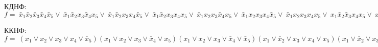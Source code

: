 \documentclass[a4paper, 20pt]{article}
\newcommand{\nx}[1]{\bar{x}_{#1}}
\newcommand{\x}[1]{x_{#1}}
\begin{document}
  КДНФ: $ f = \
  \nx{1}\nx{2}\nx{3}\nx{4}\nx{5} \vee \
  \nx{1}\nx{2}\x {3}\nx{4}\x {5} \vee \
  \nx{1}\nx{2}\x {3}\x {4}\nx{5} \vee \
  \nx{1}\nx{2}\x {3}\x {4}\x {5} \vee \
  \nx{1}\x {2}\x {3}\nx{4}\x {5} \vee \
  \nx{1}\x {2}\x {3}\x {4}\nx{5} \vee \
  \nx{1}\x {2}\x {3}\x {4}\x {5} \vee \
  \x {1}\nx{2}\nx{3}\x {4}\x {5} \vee \
  \x {1}\nx{2}\x {3}\nx{4}\x {5} \vee \
  \x {1}\nx{2}\x {3}\x {4}\nx{5} \vee \
  \x {1}\x {2}\nx{3}\x {4}\nx{5} \vee \
  \x {1}\x {2}\nx{3}\x {4}\x {5} \vee \
  \x {1}\x {2}\x {3}\nx{4}\x {5} \vee \
  $

  ККНФ: $ f = \
  (\x {1} \vee \x {2} \vee \x {3} \vee \x {4} \vee \nx{5})
  (\x {1} \vee \x {2} \vee \x {3} \vee \nx{4} \vee \x {5})
  (\x {1} \vee \x {2} \vee \x {3} \vee \nx{4} \vee \nx{5})
  (\x {1} \vee \nx{2} \vee \x {3} \vee \x {4} \vee \x {5})
  (\x {1} \vee \nx{2} \vee \x {3} \vee \x {4} \vee \nx{5})
  (\x {1} \vee \nx{2} \vee \x {3} \vee \nx{4} \vee \x {5})
  (\x {1} \vee \nx{2} \vee \x {3} \vee \nx{4} \vee \nx{5})
  (\nx{1} \vee \x {2} \vee \x {3} \vee \x {4} \vee \x {5})
  (\nx{1} \vee \x {2} \vee \x {3} \vee \x {4} \vee \nx{5})
  (\nx{1} \vee \x {2} \vee \x {3} \vee \nx{4} \vee \x {5})
  (\nx{1} \vee \x {2} \vee \nx{3} \vee \nx{4} \vee \nx{5})
  (\nx{1} \vee \nx{2} \vee \x {3} \vee \x {4} \vee \x {5})
  (\nx{1} \vee \nx{2} \vee \x {3} \vee \x {4} \vee \nx{5})
  (\nx{1} \vee \nx{2} \vee \nx{3} \vee \nx{4} \vee \x {5})
  (\nx{1} \vee \nx{2} \vee \nx{3} \vee \nx{4} \vee \nx{5})
  $
\end{document}
